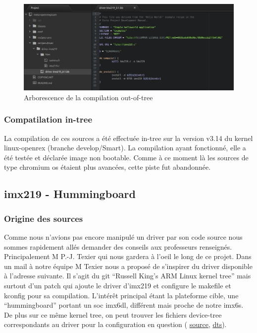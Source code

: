 {\begin{figure}[!htb]
    \centering
    \includegraphics[trim={0cm 0cm 0cm 0cm},clip,scale=0.35]{Figures/outtree.png}
    \decoRule
    \caption{Arborescence de la compilation out-of-tree} \label{fig:outtree}
\end{figure} 

\subsubsection{Compatilation in-tree}

La compilation de ces sources a été effectuée in-tree sur la version v3.14 du kernel
linux-openrex (branche develop/Smart). La compilation ayant fonctionné, elle a été testée
et déclarée image non bootable. Comme à ce moment là les sources de type chromium os
étaient plus avancées, cette piste fut abandonnée.

\subsection{imx219 - Hummingboard}

\subsubsection{Origine des sources}

Comme nous n’avions pas encore manipulé un driver par son code source nous sommes
rapidement allés demander des conseils aux professeurs renseignés. Principalement M
P.-J. Texier qui nous gardera à l’oeil le long de ce projet. Dans un mail à notre équipe M
Texier nous a proposé de s’inspirer du driver disponible à l’adresse suivante. Il s’agit du git
“Russell King's ARM Linux kernel tree” mais surtout d’un patch qui ajoute le driver
d’imx219 et configure le makefile et kconfig pour sa compilation. L’intérêt principal étant la
plateforme cible, une “hummingboard” portant un soc imx6dl, différent mais proche de
notre imx6s.
De plus sur ce même kernel tree, on peut trouver les fichiers device-tree correspondants
au driver pour la configuration en question (
\href{http://git.armlinux.org.uk/cgit/linux-arm.git/commit/?h=csi-v6&id=e3f847cd37b007d55b76282414bfcf13abb8fc9a}
{source}, 
\href{http://git.armlinux.org.uk/cgit/linux-arm.git/commit/?h=csi-v6&id=4bd8e1231a2e6eca6a65b565176ea9722611c8dd}
{dts}).

}
